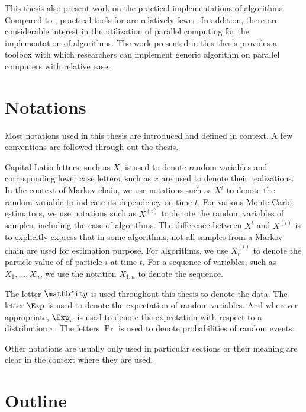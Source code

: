 This thesis also present work on the practical implementations of \smc
algorithms. Compared to \mcmc, practical tools for \smc are relatively fewer.
In addition, there are considerable interest in the utilization of parallel
computing for the implementation of \smc algorithms. The work presented in
this thesis provides a toolbox with which researchers can implement generic
\smc algorithm on parallel computers with relative ease.

\section{Notations}
\label{sec:Notations}

Most notations used in this thesis are introduced and defined in context. A
few conventions are followed through out the thesis.

Capital Latin letters, such as $X$, is used to denote random variables and
corresponding lower case letters, such as $x$ are used to denote their
realizations. In the context of Markov chain, we use notations such as $X^t$
to denote the random variable to indicate its dependency on time $t$. For
various Monte Carlo estimators, we use notations such as $X^{(i)}$ to denote
the random variables of samples, including the case of  \mcmc algorithms. The
difference between $X^t$ and $X^{(i)}$ is to explicitly express that in some
algorithms, not all samples from a Markov chain are used for estimation
purpose. For \smc algorithms, we use $X_t^{(i)}$ to denote the particle value
of of particle $i$ at time $t$. For a sequence of variables, such as
$X_1,\dots,X_n$, we use the notation $X_{1:n}$ to denote the sequence.

The letter $\data$ is used throughout this thesis to denote the data. The
letter $\Exp$ is used to denote the expectation of random variables. And
wherever appropriate, $\Exp_{\pi}$ is used to denote the expectation with
respect to a distribution $\pi$. The letters $\Pr$ is used to denote
probabilities of random events.

Other notations are usually only used in particular sections or their meaning
are clear in the context where they are used.

\section{Outline}
\label{sec:Outline}

